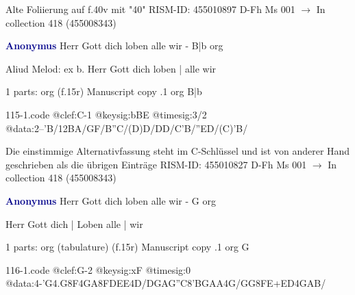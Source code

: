 \documentclass[twocolumn]{book}
\begin{document}
\newline Alte Foliierung auf f.40v mit "40"
\newline RISM-ID: 455010897
\newline D-Fh  Ms 001
\newline $\rightarrow$ In collection 418 (455008343)
      
\newline \par \vspace{7pt} \textcolor{darkblue}{\textbf{Anonymus  }}
\newline Herr Gott dich loben alle wir - B|b
\newline org
\newline \begin{itshape} Aliud Melod: ex b. Herr Gott dich loben | alle wir\end{itshape} 
\newline \textcolor{darkblue}{}  1 parts: org  (f.15r)
\newline Manuscript copy
.1  org  B|b  
\begin{filecontents*}{115-1.code}
@clef:C-1
@keysig:bBE
@timesig:3/2
@data:2--'B/12BA/GF/B''C/(D)D/DD/C'B/''ED/(C)'B/
\end{filecontents*}
\newline
%

\newline Die einstimmige Alternativfassung steht im C-Schlüssel und ist von anderer Hand geschrieben als die übrigen Einträge
\newline RISM-ID: 455010827
\newline D-Fh  Ms 001
\newline $\rightarrow$ In collection 418 (455008343)
      
\newline \par \vspace{7pt} \textcolor{darkblue}{\textbf{Anonymus  }}
\newline Herr Gott dich loben alle wir - G
\newline org
\newline \begin{itshape}[f.15r, at left:] Herr Gott dich | Loben alle | wir\end{itshape} 
\newline \textcolor{darkblue}{}  1 parts: org (tabulature)  (f.15r)
\newline Manuscript copy
.1  org  G  
\begin{filecontents*}{116-1.code}
@clef:G-2
@keysig:xF
@timesig:0
@data:4-'G4.G8F4GA{8FDEE}4D/DGAG''C{8'BGAA}4G/GG{8FE+}{ED}4GAB/
\end{filecontents*}
\newline
%
\end{document}
